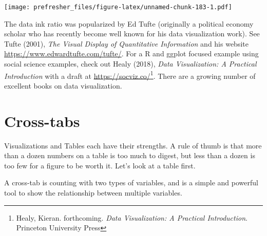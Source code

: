 \documentclass[]{book}
\newenvironment{Shaded}{\begin{snugshade}}{\end{snugshade}}
\newcommand{\KeywordTok}[1]{\textcolor[rgb]{0.13,0.29,0.53}{\textbf{#1}}}
\newcommand{\NormalTok}[1]{#1}
\newcommand{\OperatorTok}[1]{\textcolor[rgb]{0.81,0.36,0.00}{\textbf{#1}}}
\newcommand{\StringTok}[1]{\textcolor[rgb]{0.31,0.60,0.02}{#1}}
\let\rmarkdownfootnote\footnote%
\def\footnote{\protect\rmarkdownfootnote}
\theoremstyle{definition}
\theoremstyle{definition}
\theoremstyle{definition}
\theoremstyle{remark}
\begin{document}
\begin{Shaded}
\begin{Highlighting}[]
\begin{Shaded}
\begin{Highlighting}[]
\texttt{[image: prefresher\_files/figure-latex/unnamed-chunk-183-1.pdf]}

The data ink ratio was popularized by Ed Tufte (originally a political economy scholar who has recently become well known for his data visualization work). See Tufte (2001), \emph{The Visual Display of Quantitative Information} and his website \url{https://www.edwardtufte.com/tufte/}. For a R and ggplot focused example using social science examples, check out Healy (2018), \emph{Data Visualization: A Practical Introduction} with a draft at \url{https://socviz.co/}\footnote{Healy, Kieran. forthcoming. \emph{Data Visualization: A Practical Introduction}. Princeton University Press}. There are a growing number of excellent books on data visualization.

\hypertarget{cross-tabs}{%
\section{Cross-tabs}\label{cross-tabs}}

Visualizations and Tables each have their strengths. A rule of thumb is that more than a dozen numbers on a table is too much to digest, but less than a dozen is too few for a figure to be worth it. Let's look at a table first.

A cross-tab is counting with two types of variables, and is a simple and powerful tool to show the relationship between multiple variables.

\begin{Shaded}
\end{Shaded}


\end{Highlighting}
\end{Shaded}
\end{Highlighting}
\end{Shaded}
\end{document}
